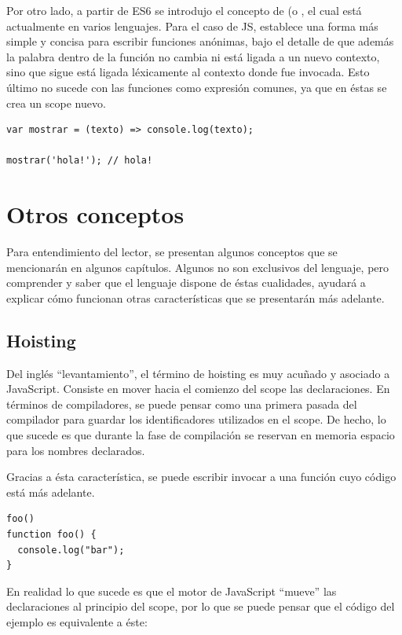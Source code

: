 Por otro lado, a partir de ES6 se introdujo el concepto de  (o , el cual está actualmente en varios lenguajes. Para el caso de JS, establece una forma más simple y concisa para escribir funciones anónimas, bajo el detalle de que además la palabra  dentro de la función no cambia ni está ligada a un nuevo contexto, sino que sigue está ligada léxicamente al contexto donde fue invocada. Esto último no sucede con las funciones como expresión comunes, ya que en éstas se crea un scope nuevo.

\begin{lstlisting}[title={\code{Arrow function}}]
var mostrar = (texto) => console.log(texto);

mostrar('hola!'); // hola!
\end{lstlisting}

\section{Otros conceptos}

Para entendimiento del lector, se presentan algunos conceptos que se mencionarán en algunos capítulos. Algunos no son exclusivos del lenguaje, pero comprender y saber que el lenguaje dispone de éstas cualidades, ayudará a explicar cómo funcionan otras características que se presentarán más adelante.

\subsection{Hoisting}

Del inglés "`levantamiento"', el término de hoisting es muy acuñado y asociado a JavaScript. Consiste en mover hacia el comienzo del scope las declaraciones. En términos de compiladores, se puede pensar como una primera pasada del compilador para guardar los identificadores utilizados en el scope. De hecho, lo que sucede es que durante la fase de compilación se reservan en memoria espacio para los nombres declarados.

Gracias a ésta característica, se puede escribir invocar a una función cuyo código está más adelante.

\begin{lstlisting}
foo()
function foo() {
  console.log("bar");
}
\end{lstlisting}

En realidad lo que sucede es que el motor de JavaScript "`mueve"' las declaraciones al principio del scope, por lo que se puede pensar que el código del ejemplo es equivalente a éste:

